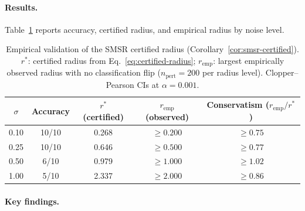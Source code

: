 \paragraph{Results.} Table~\ref{tab:smsr-empirical} reports accuracy, certified radius, and empirical radius by noise level.

\begin{table}[h]
\centering
\small
\caption{Empirical validation of the SMSR certified radius (Corollary~\ref{cor:smsr-certified}). $r^*$: certified radius from Eq.~\ref{eq:certified-radius}; $r_{\text{emp}}$: largest empirically observed radius with no classification flip ($n_{\text{pert}} = 200$ per radius level). Clopper--Pearson CIs at $\alpha = 0.001$.}
\label{tab:smsr-empirical}
\begin{tabular}{ccccc}
\toprule
$\sigma$ & Accuracy & $r^*$ (certified) & $r_{\text{emp}}$ (observed) & Conservatism ($r_{\text{emp}} / r^*$) \\
\midrule
0.10  & 10/10 & 0.268 & $\geq 0.200$ & $\geq 0.75$ \\
0.25  & 10/10 & 0.646 & $\geq 0.500$ & $\geq 0.77$ \\
0.50  & 6/10  & 0.979 & $\geq 1.000$ & $\geq 1.02$ \\
1.00  & 5/10  & 2.337 & $\geq 2.000$ & $\geq 0.86$ \\
\bottomrule
\end{tabular}
\end{table}

\paragraph{Key findings.}

